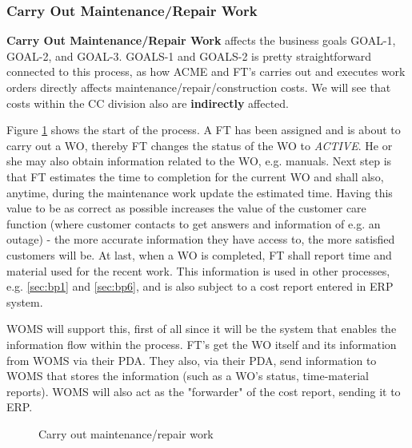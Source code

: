 \subsubsection{Carry Out Maintenance/Repair Work}
\label{sec:bp4}
\textbf{Carry Out Maintenance/Repair Work} affects the business goals GOAL-1, GOAL-2, and GOAL-3. GOALS-1 and GOALS-2 is pretty straightforward connected to this process, as how ACME and FT's carries out and executes work orders directly affects maintenance/repair/construction costs. We will see that costs within the CC division also are \textbf{indirectly} affected.

Figure \ref{fig:carry} shows the start of the process. A FT has been assigned and is about to carry out a WO, thereby FT changes the status of the WO to \emph{ACTIVE}. He or she may also obtain information related to the WO, e.g. manuals. Next step is that FT estimates the time to completion for the current WO and shall also, anytime, during the maintenance work update the estimated time. Having this value to be as correct as possible increases the value of the customer care function (where customer contacts to get answers and information of e.g. an outage) - the more accurate information they have access to, the more satisfied customers will be. At last, when a WO is completed, FT shall report time and material used for the recent work. This information is used in other processes, e.g. \ref{sec:bp1} and \ref{sec:bp6}, and is also subject to a cost report entered in ERP system.

WOMS will support this, first of all since it will be the system that enables the information flow within the process. FT's get the WO itself and its information from WOMS via their PDA. They also, via their PDA, send information to WOMS that stores the information (such as a WO's status, time-material reports). WOMS will also act as the "forwarder" of the cost report, sending it to ERP.
\begin{figure}[H]
	\centering
	\setlength\fboxsep{7pt}
	\setlength\fboxrule{0.5pt}
	\label{fig:carry}
	\caption{Carry out maintenance/repair work}
\end{figure}
%
